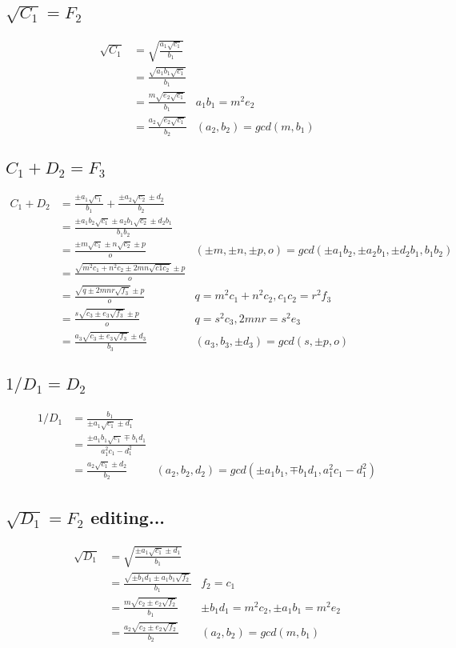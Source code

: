 \documentclass{article}
\begin{document}
\subsection{$\sqrt{C_1} = F_2$}
\begin{align*}
\sqrt{C_1} &= \sqrt{\frac{a_1\sqrt{c_1}}{b_1}}\\
 &= \frac{\sqrt{a_1b_1\sqrt{c_1}}}{b_1}     \\
 &= \frac{m\sqrt{e_2\sqrt{c_1}}}{b_1}       & a_1b_1 = m^2e_2\\
 &= \frac{a_2\sqrt{e_2\sqrt{c_1}}}{b_2}     & (a_2,b_2) = gcd(m,b_1)
\end{align*}

\subsection{$C_1 + D_2 = F_3$}
\begin{align*}
C_1 + D_2 &= \frac{\pm a_1\sqrt{c_1}}{b_1} + \frac{\pm a_2\sqrt{c_2} \pm d_2 }{b_2}\\
 &= \frac{\pm a_1b_2\sqrt{c_1} \pm a_2b_1\sqrt{c_2} \pm d_2b_1}{b_1b_2} \\
 &= \frac{\pm m\sqrt{c_1} \pm n\sqrt{c_2} \pm p}{o} 
 & (\pm m, \pm n, \pm p, o) = gcd(\pm a_1b_2, \pm a_2b_1, \pm d_2b_1, b_1b_2)\\
 &= \frac{\sqrt{m^2c_1 + n^2c_2 \pm 2mn\sqrt{c1c_2}} \pm p }{o} \\
 &= \frac{\sqrt{q \pm 2mnr\sqrt{f_3}} \pm p}{o}     & q = m^2c_1 + n^2c_2, c_1c_2 = r^2f_3\\
 &= \frac{s\sqrt{c_3 \pm e_3\sqrt{f_3}} \pm p}{o}   & q = s^2c_3, 2mnr = s^2e_3 \\
 &= \frac{a_3\sqrt{c_3 \pm e_3\sqrt{f_3}} \pm d_3}{b_3}
    & (a_3, b_3, \pm d_3) = gcd(s, \pm p, o)
\end{align*}

\subsection{$1 / D_1 = D_2$}
\begin{align*}
1 / D_1 &= \frac{b_1}{\pm a_1\sqrt{c_1} \pm d_1 }\\
 &= \frac{\pm a_1b_1\sqrt{c_1} \mp b_1d_1 }{a_1^2c_1 - d_1^2}\\
 &= \frac{a_2\sqrt{c_1} \pm d_2}{b_2}
    & (a_2, b_2, d_2) = gcd(\pm a_1b_1, \mp b_1d_1, a_1^2c_1 - d_1^2)
\end{align*}

\subsection{$\sqrt{D_1} = F_2$ editing...}
\begin{align*}
\sqrt{D_1} &= \sqrt{\frac{\pm a_1\sqrt{c_1} \pm d_1 }{b_1}}\\
 &= \frac{\sqrt{\pm b_1d_1 \pm a_1b_1\sqrt{f_2}}}{b_1}
    & f_2 = c_1\\
 &= \frac{m\sqrt{c_2 \pm e_2\sqrt{f_2}}}{b_1}
    & \pm b_1d_1 = m^2c_2, \pm a_1b_1 = m^2e_2\\
 &= \frac{a_2\sqrt{c_2 \pm e_2\sqrt{f_2}}}{b_2}
    & (a_2, b_2) = gcd(m, b_1)
\end{align*}
\end{document}
